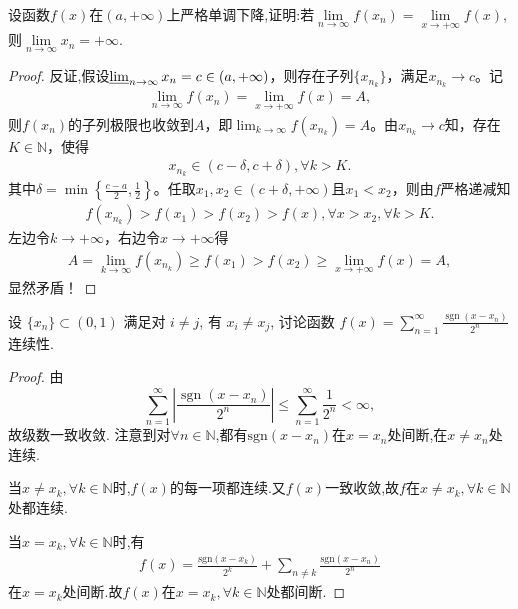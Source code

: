 \documentclass[../../main.tex]{subfiles}
\begin{document}
\begin{example}
设函数$f(x)$在$(a,+\infty)$上严格单调下降,证明:若$\lim\limits_{n \to \infty} f(x_n)=\lim\limits_{x \to +\infty} f(x)$,则$\lim\limits_{n \to \infty} x_n=+\infty$. 
\end{example}
\begin{proof}
反证,假设$\varliminf_{n\rightarrow \infty}x_n=c\in \left( a,+\infty \right)$，则存在子列$\{ x_{n_k} \}$，满足$x_{n_k}\rightarrow c$。记
\begin{align*}
\lim_{n\rightarrow \infty}f\left( x_n \right) =\lim_{x\rightarrow +\infty}f\left( x \right) =A,
\end{align*}
则$f\left( x_n \right)$的子列极限也收敛到$A$，即$\lim_{k\rightarrow \infty}f\left( x_{n_k} \right) =A$。由$x_{n_k}\rightarrow c$知，存在$K\in \mathbb{N}$，使得
\begin{align*}
x_{n_k}\in \left( c-\delta ,c+\delta \right),\forall k>K.
\end{align*}
其中$\delta =\min \left\{ \frac{c-a}{2},\frac{1}{2} \right\}$。任取$x_1,x_2\in \left( c+\delta ,+\infty \right)$且$x_1<x_2$，则由$f$严格递减知
\begin{align*}
f\left( x_{n_k} \right) >f\left( x_1 \right) >f\left( x_2 \right) >f\left( x \right),\forall x>x_2,\forall k>K.
\end{align*}
左边令$k\rightarrow +\infty$，右边令$x\rightarrow +\infty$得
\begin{align*}
A=\lim_{k\rightarrow \infty}f\left( x_{n_k} \right) \geqslant f\left( x_1 \right) >f\left( x_2 \right) \geqslant \lim_{x\rightarrow +\infty}f\left( x \right) =A,
\end{align*}
显然矛盾！

\end{proof}

\begin{example}
设 $\{x_n\} \subset (0,1)$ 满足对 $i \neq j$, 有 $x_i \neq x_j$, 讨论函数 $f(x) = \sum_{n=1}^\infty \frac{\operatorname{sgn}(x - x_n)}{2^n}$ 连续性.
\end{example}
\begin{proof}
由
\[
\sum_{n=1}^\infty \left| \frac{\operatorname{sgn}(x - x_n)}{2^n} \right| \leqslant \sum_{n=1}^\infty \frac{1}{2^n} < \infty,
\]
故级数一致收敛. 注意到对$\forall n\in \mathbb{N} $,都有$\mathrm{sgn} \left( x-x_n \right) $在$x=x_n$处间断,在$x\ne x_n$处连续.

当$x\ne x_k,\forall k\in \mathbb{N} $时,$f\left( x \right) $的每一项都连续.又$f\left( x \right) $一致收敛,故$f$在$x\ne x_k,\forall k\in \mathbb{N} $处都连续.

当$x=x_k,\forall k\in \mathbb{N} $时,有
\begin{align*}
f\left( x \right) =\frac{\mathrm{sgn} \left( x-x_k \right)}{2^k}+\sum_{n\ne k}{\frac{\mathrm{sgn} \left( x-x_n \right)}{2^n}}
\end{align*}
在$x=x_k$处间断.故$f\left( x \right) $在$x=x_k,\forall k\in \mathbb{N} $处都间断.

\end{proof}
\end{document}
